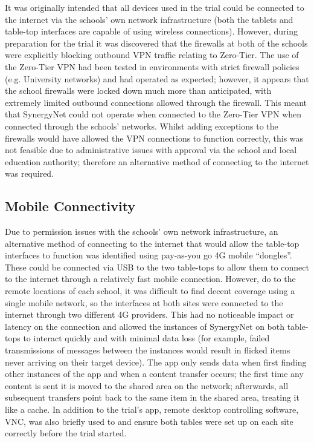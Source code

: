 \documentclass[a4paper,11pt]{article}
\begin{document}
It was originally intended that all devices used in the trial could be connected to the internet via the schools' own network infrastructure (both the tablets and table-top interfaces are capable of using wireless connections).
However, during preparation for the trial it was discovered that the firewalls at both of the schools were explicitly blocking outbound VPN traffic relating to Zero-Tier.
The use of the Zero-Tier VPN had been tested in environments with strict firewall policies (e.g. University networks) and had operated as expected; however, it appears that the school firewalls were locked down much more than anticipated, with extremely limited outbound connections allowed through the firewall.
This meant that SynergyNet could not operate when connected to the Zero-Tier VPN when connected through the schools’ networks.
Whilst adding exceptions to the firewalls would have allowed the VPN connections to function correctly, this was not feasible due to administrative issues with approval via the school and local education authority; therefore an alternative method of connecting to the internet was required.

\subsection{Mobile Connectivity}

Due to permission issues with the schools' own network infrastructure, an alternative method of connecting to the internet that would allow the table-top interfaces to function was identified using pay-as-you go 4G mobile ``dongles''.
These could be connected via USB to the two table-tops to allow them to connect to the internet through a relatively fast mobile connection.
However, do to the remote locations of each school, it was difficult to find decent coverage using a single mobile network, so the interfaces at both sites were connected to the internet through two different 4G providers.
This had no noticeable impact or latency on the connection and allowed the instances of SynergyNet on both table-tops to interact quickly and with minimal data loss (for example, failed transmissions of messages between the instances would result in flicked items never arriving on their target device).
The app only sends data when first finding other instances of the app and when a content transfer occurs; the first time any content is sent it is moved to the shared area on the network; afterwards, all subsequent transfers point back to the same item in the shared area, treating it like a cache.
In addition to the trial's app, remote desktop controlling software, VNC, was also briefly used to and ensure both tables were set up on each site correctly before the trial started.
\end{document}
